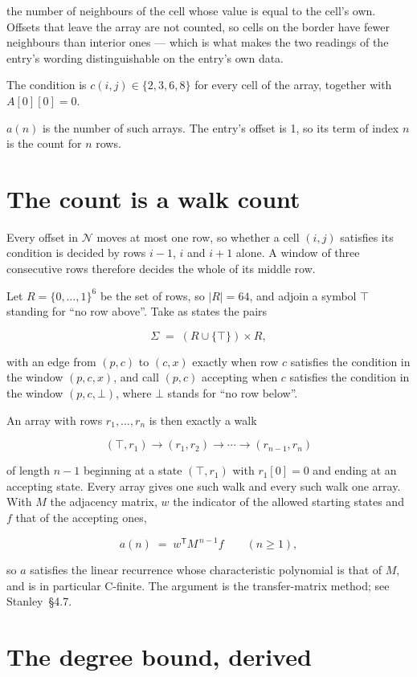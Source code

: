 \documentclass[11pt]{article}
\theoremstyle{definition}
\begin{document}
the number of neighbours of the cell whose value is equal to the cell's own. Offsets that leave the array are not counted, so cells on the border have fewer neighbours than interior ones --- which is what makes the two readings of the entry's wording distinguishable on the entry's own data.

The condition is $c(i,j) \in \{2, 3, 6, 8\}$ for every cell of the array, together with $A[0][0]=0$.

$a(n)$ is the number of such arrays. The entry's offset is 1, so its term of index $n$ is the count for $n$ rows.

\section{The count is a walk count}

Every offset in $\mathcal{N}$ moves at most one row, so whether a cell $(i,j)$ satisfies its condition is decided by rows $i-1$, $i$ and $i+1$ alone. A window of three consecutive rows therefore decides the whole of its middle row.

Let $R = \{0,\dots,1\}^{6}$ be the set of rows, so $|R| = 64$, and adjoin a symbol $\top$ standing for ``no row above''. Take as states the pairs

\[\Sigma \;=\; (R \cup \{\top\}) \times R,\]

with an edge from $(p,c)$ to $(c,x)$ exactly when row $c$ satisfies the condition in the window $(p,c,x)$, and call $(p,c)$ accepting when $c$ satisfies the condition in the window $(p,c,\bot)$, where $\bot$ stands for ``no row below''.

An array with rows $r_1,\dots,r_n$ is then exactly a walk

\[(\top,r_1) \to (r_1,r_2) \to \cdots \to (r_{n-1},r_n)\]

of length $n-1$ beginning at a state $(\top,r_1)$ with $r_1[0]=0$ and ending at an accepting state. Every array gives one such walk and every such walk one array. With $M$ the adjacency matrix, $w$ the indicator of the allowed starting states and $f$ that of the accepting ones,

\[a(n) \;=\; w^{\mathsf T} M^{\,n-1} f \qquad (n \ge 1),\]

so $a$ satisfies the linear recurrence whose characteristic polynomial is that of $M$, and is in particular C-finite. The argument is the transfer-matrix method; see Stanley~\S4.7.

\section{The degree bound, derived}
\end{document}
